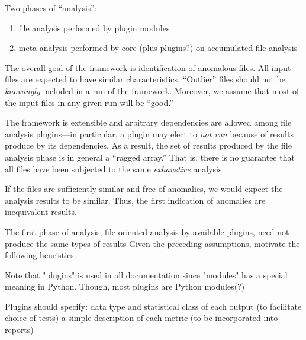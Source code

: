\documentclass {article}
\begin{document}
Two phases of ``analysis'':
\begin{enumerate}
\item file analysis performed by plugin modules
\item meta analysis performed by core (plus plugins?) on accumulated file analysis
\end{enumerate}

The overall goal of the framework is identification of anomalous
files.
All input files are expected to have similar characteristics.
``Outlier'' files should not be \emph{knowingly} included in
a run of the framework.
Moreover, we assume that most of the input files in any given
run will be ``good.''

The framework is extensible and arbitrary dependencies
are allowed among file analysis plugins---in particular, a plugin may
elect to \emph{not run} because of results produce by its
dependencies. As a result, the set of results produced by
the file analysis phase is in general a ``ragged array.''
That is, there is no guarantee that all files have been subjected
to the same \emph{exhaustive} analysis.

If the files are sufficiently similar and free of anomalies,
we would expect the analysis results to be similar. Thus, the
first indication of anomalies are inequivalent results.

The first phase of analysis, file-oriented analysis by available
plugins, need not produce the same types of results
Given the preceding assumptions,  motivate the following heuristics.

Note that "plugins" is used in all documentation since "modules" has
a special meaning in Python. Though, most plugins are Python modules(?)

Plugins should specify:
data type and statistical class of each output (to facilitate choice of tests)
a simple description of each metric (to be incorporated into reports)
\end{document}
